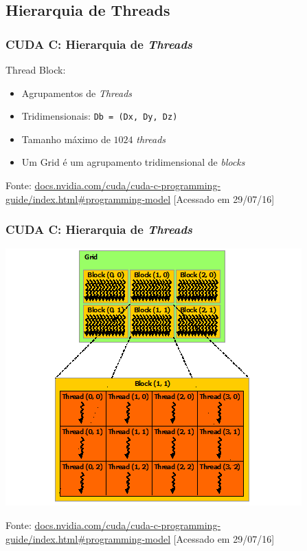 \documentclass[10pt, compress]{beamer}
\begin{document}
\subsection{Hierarquia de Threads}

\begin{frame}
    \frametitle{CUDA C: Hierarquia de \textit{Threads}}
    \alert{Thread Block}:
    \begin{itemize}
        \item Agrupamentos de \textit{Threads}
            \pause
        \item \alert{Tridimensionais}: \texttt{\footnotesize{Db = (Dx, Dy, Dz)}}
            \pause
        \item Tamanho \alert{máximo} de $1024$ \textit{threads}
            \pause
        \item Um \alert{Grid} é um agrupamento tridimensional de \textit{blocks}
    \end{itemize}

    \vfill

    \begin{center}
        \tiny{Fonte: \url{docs.nvidia.com/cuda/cuda-c-programming-guide/index.html\#programming-model} [Acessado em 29/07/16]}
    \end{center}
\end{frame}

\begin{frame}
    \frametitle{CUDA C: Hierarquia de \textit{Threads}}
    \centering
    \includegraphics[width=.7\textwidth]{grid-of-thread-blocks}

    \tiny{Fonte: \url{docs.nvidia.com/cuda/cuda-c-programming-guide/index.html\#programming-model} [Acessado em 29/07/16]}
\end{frame}
\end{document}
